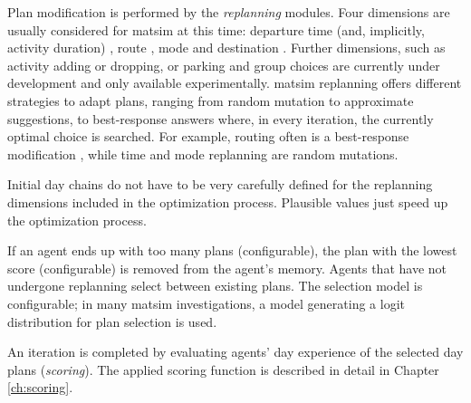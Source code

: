 Plan modification is performed by the \emph{replanning} modules. Four dimensions are usually considered for \gls{matsim} at this time: departure time (and, implicitly, activity duration) \citep[][]{BalmerRaneyEtAl2005act-times}, route \citep[]{LefebvreBalmer_unpub_STRC_2007}, mode \citep{GretherEtAl2009SimpleModeChoiceIPL} and destination \citep{HorniEtAl_TRR_2009,
HorniEtAl2011TrbLocationChoice%
}. 
Further dimensions, such as activity adding or dropping, or parking and group choices are currently under development and only available experimentally. %
\gls{matsim} replanning offers different strategies to adapt plans, ranging from random mutation to approximate suggestions, to best-response answers where, in every iteration, the currently optimal choice is searched. For example, routing
often is a best-response modification%
, while time and mode replanning are random mutations.

Initial day chains do not have to be very carefully defined for the replanning dimensions included in the optimization process. Plausible values just speed up the optimization process. 

If an agent ends up with too many plans (configurable), the plan with the lowest score (configurable) is removed from the agent's memory. Agents that have not undergone replanning select between existing plans. The selection model is configurable; in many \gls{matsim} investigations, a model generating a logit distribution for plan selection is used.

An iteration is completed by evaluating agents' day experience of the selected day plans (\emph{scoring}). The applied scoring function is described in detail in Chapter \ref{ch:scoring}.

